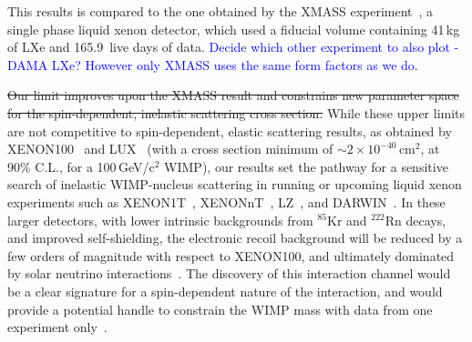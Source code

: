 This results is compared to the one obtained by the XMASS experiment~\cite{Uchida:2014cnn}, a single phase liquid xenon detector, which used a fiducial volume containing 41\,kg of LXe and 165.9~live days of data. \textcolor{blue}{Decide which other experiment to also plot - DAMA LXe? However only XMASS uses the same form factors as we do.}


\sout{Our limit improves upon the XMASS result and constrains new parameter space for the spin-dependent, inelastic scattering cross section. }
While these upper limits are not competitive to spin-dependent, elastic scattering results, as obtained by XENON100~\cite{Aprile:2013doa} and LUX~\cite{Akerib:2016lao} (with a cross section minimum of $\sim2 \times 10^{-40}$\,cm$^{2}$, at 90\% C.L.,  for a 100\,GeV/c$^2$ WIMP), our results set the pathway for a sensitive search of inelastic WIMP-nucleus scattering in running or upcoming liquid xenon experiments such as XENON1T~\cite{Aprile:2015uzo}, XENONnT~\cite{Aprile:2015uzo},  LZ~\cite{Akerib:2015cja}, and DARWIN~\cite{Aalbers:2016jon}. In these larger detectors, with lower intrinsic backgrounds from $^{85}$Kr and $^{222}$Rn decays, and improved self-shielding, the electronic recoil background will be reduced by a few orders of magnitude with respect to XENON100, and ultimately dominated by solar neutrino interactions~\cite{Baudis:2013qla}. 
The discovery of this interaction channel would be a clear signature for a spin-dependent nature of the interaction, and would provide a potential handle  to constrain the WIMP mass with data from one experiment only~\cite{Baudis:2013bba,McCabe:2016aof}.

\newpage
